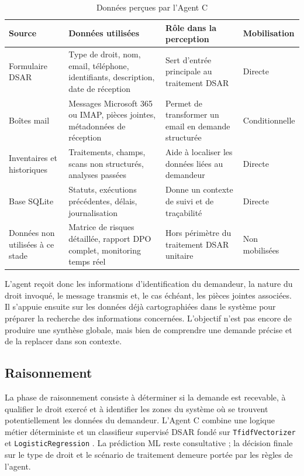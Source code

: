 \documentclass[12pt,a4paper]{report}
\begin{document}
\begin{table}[H]
\centering
\caption{Données perçues par l'Agent C}
\label{tab:perception_agent_c}
\begin{tabularx}{\textwidth}{|p{3cm}|X|X|p{2.7cm}|}
\hline
\textbf{Source} & \textbf{Données utilisées} & \textbf{Rôle dans la perception} & \textbf{Mobilisation} \\
\hline
Formulaire DSAR & Type de droit, nom, email, téléphone, identifiants, description, date de réception & Sert d'entrée principale au traitement DSAR & Directe \\
\hline
Boîtes mail & Messages Microsoft 365 ou IMAP, pièces jointes, métadonnées de réception & Permet de transformer un email en demande structurée & Conditionnelle \\
\hline
Inventaires et historiques & Traitements, champs, scans non structurés, analyses passées & Aide à localiser les données liées au demandeur & Directe \\
\hline
Base SQLite & Statuts, exécutions précédentes, délais, journalisation & Donne un contexte de suivi et de traçabilité & Directe \\
\hline
Données non utilisées à ce stade & Matrice de risques détaillée, rapport DPO complet, monitoring temps réel & Hors périmètre du traitement DSAR unitaire & Non mobilisées \\
\hline
\end{tabularx}
\end{table}

L'agent reçoit donc les informations d'identification du demandeur, la nature du droit invoqué, le message transmis et, le cas échéant, les pièces jointes associées. Il s'appuie ensuite sur les données déjà cartographiées dans le système pour préparer la recherche des informations concernées. L'objectif n'est pas encore de produire une synthèse globale, mais bien de comprendre une demande précise et de la replacer dans son contexte.

\subsection{Raisonnement}

La phase de raisonnement consiste à déterminer si la demande est recevable, à qualifier le droit exercé et à identifier les zones du système où se trouvent potentiellement les données du demandeur. L'Agent C combine une logique métier déterministe et un classifieur supervisé DSAR fondé sur \texttt{TfidfVectorizer} et \texttt{LogisticRegression} \cite{sklearn_tfidf,sklearn_logreg}. La prédiction ML reste consultative ; la décision finale sur le type de droit et le scénario de traitement demeure portée par les règles de l'agent.
\end{document}
